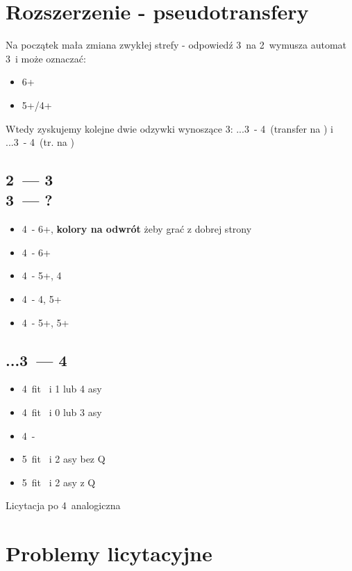 \documentclass[12pt, a4paper]{article}
\begin{document}
    \section{Rozszerzenie - pseudotransfery}
    Na początek mała zmiana zwykłej strefy - odpowiedź 3\spades\ na 2\nt\ wymusza automat 3\nt\ i może oznaczać:
    \begin{itemize}
        \item 6+\minor
        \item 5+/4+ \minor
    \end{itemize}
    Wtedy zyskujemy kolejne dwie odzywki wynoszące 3\nt:
    ...3\nt\ - 4\diams\ (transfer na \clubs) i ...3\nt\ - 4\hearts\ (tr. na \diams)
    \subsection{2\ntx\ --- 3\spades \\ 3\ntx\ --- ?}
    \begin{itemize}
        \item 4\clubs\ - 6+\diams, \textbf{kolory na odwrót} żeby grać z dobrej strony
        \item 4\diams\ - 6+\clubs 
        \item 4\hearts\ - 5+\clubs, 4\diams
        \item 4\spades\ - 4\clubs, 5+\diams 
        \item 4\nt\ - 5+\clubs, 5+\diams
    \end{itemize}
    \subsection{...3\ntx\ --- 4\diams}
    \begin{itemize}
        \item 4\hearts\ fit \clubs\ i 1 lub 4 asy
        \item 4\spades\ fit \clubs\ i 0 lub 3 asy
        \item 4\nt\ - \soff
        \item 5\clubs\ fit \clubs\ i 2 asy bez \clubs Q
        \item 5\diams\ fit \clubs\ i 2 asy z \clubs Q
    \end{itemize}
    Licytacja po 4\hearts\ analogiczna

    \section{Problemy licytacyjne}
\end{document}
